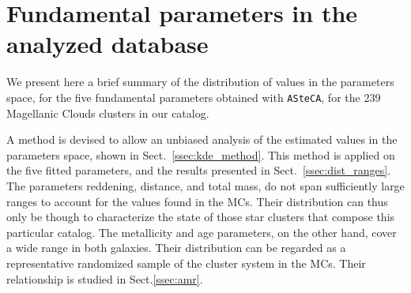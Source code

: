 \documentclass[draft]{aa}
\begin{document}

\section{Fundamental parameters in the analyzed database}
\label{sec:param-dist}

We present here a brief summary of the distribution of values in the parameters
space, for the five fundamental parameters obtained with \texttt{ASteCA}, for
the 239 Magellanic Clouds clusters in our catalog.

A method is devised to allow an unbiased analysis of the estimated values in the
parameters space, shown in Sect.~\ref{ssec:kde_method}.
%
This method is applied on the five fitted parameters, and the results presented
in Sect.~\ref{ssec:dist_ranges}. The parameters reddening, distance, and total
mass, do not span sufficiently large ranges to account for the values found
in the MCs. Their distribution can thus only be though to characterize the state
of those star clusters that compose this particular catalog.
%
The metallicity and age parameters, on the other hand, cover a wide range in
both galaxies. Their distribution can be regarded as a representative
randomized sample of the cluster system in the MCs. Their relationship is
studied in Sect.\ref{ssec:amr}.

%

\end{document}
